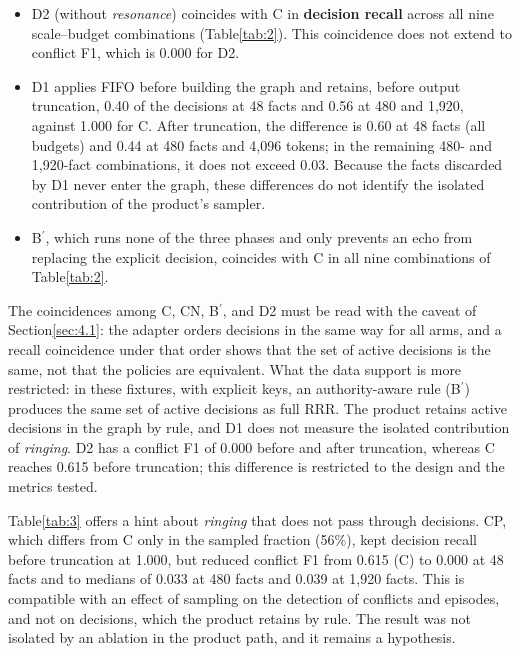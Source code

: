 \documentclass[11pt,a4paper]{article}
\begin{document}
\begin{itemize}\setlength{\itemsep}{1pt}
\item D2 (without \emph{resonance}) coincides with C in \textbf{decision recall} across all nine scale--budget combinations (Table\nobreakspace{}\ref{tab:2}). This coincidence does not extend to conflict F1, which is 0.000 for D2.
\item D1 applies FIFO before building the graph and retains, before output truncation, 0.40 of the decisions at 48 facts and 0.56 at 480 and 1,920, against 1.000 for C. After truncation, the difference is 0.60 at 48 facts (all budgets) and 0.44 at 480 facts and 4,096 tokens; in the remaining 480- and 1,920-fact combinations, it does not exceed 0.03. Because the facts discarded by D1 never enter the graph, these differences do not identify the isolated contribution of the product's sampler.
\item B\ensuremath{^{\prime}}, which runs none of the three phases and only prevents an echo from replacing the explicit decision, coincides with C in all nine combinations of Table\nobreakspace{}\ref{tab:2}.
\end{itemize}
The coincidences among C, CN, B\ensuremath{^{\prime}}, and D2 must be read with the caveat of Section\nobreakspace{}\ref{sec:4.1}: the adapter orders decisions in the same way for all arms, and a recall coincidence under that order shows that the set of active decisions is the same, not that the policies are equivalent. What the data support is more restricted: in these fixtures, with explicit keys, an authority-aware rule (B\ensuremath{^{\prime}}) produces the same set of active decisions as full RRR. The product retains active decisions in the graph by rule, and D1 does not measure the isolated contribution of \emph{ringing}. D2 has a conflict F1 of 0.000 before and after truncation, whereas C reaches 0.615 before truncation; this difference is restricted to the design and the metrics tested.

Table\nobreakspace{}\ref{tab:3} offers a hint about \emph{ringing} that does not pass through decisions. CP, which differs from C only in the sampled fraction (56\%), kept decision recall before truncation at 1.000, but reduced conflict F1 from 0.615 (C) to 0.000 at 48 facts and to medians of 0.033 at 480 facts and 0.039 at 1,920 facts. This is compatible with an effect of sampling on the detection of conflicts and episodes, and not on decisions, which the product retains by rule. The result was not isolated by an ablation in the product path, and it remains a hypothesis.
\end{document}

